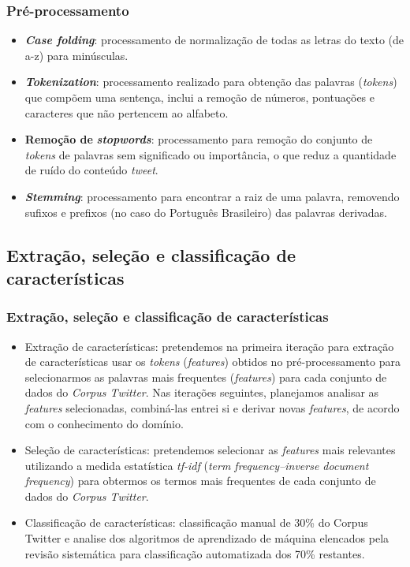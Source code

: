 \documentclass{beamer}
\begin{document}
\begin{frame}
\frametitle{Pré-processamento}
\begin{itemize}
\item \textit{\textbf{Case folding}}: processamento de normalização de todas as letras do texto (de a-z) para minúsculas.
\item \textit{\textbf{Tokenization}}: processamento realizado para obtenção das palavras  (\textit{tokens}) que compõem uma sentença, inclui a remoção de números, pontuações e caracteres que não pertencem ao alfabeto.  
\item \textbf{Remoção de} \textit{\textbf{stopwords}}: processamento para remoção do conjunto de \textit{tokens} de palavras sem significado ou importância, o que reduz a quantidade de ruído do conteúdo \textit{tweet}.
\item \textit{\textbf{Stemming}}: processamento para encontrar a raiz de uma palavra, removendo sufixos e prefixos (no caso do Português Brasileiro) das palavras derivadas.
\end{itemize}
\end{frame}
\subsection{Extração, seleção e classificação de características}
\begin{frame}
\frametitle{Extração, seleção e classificação de características}
\begin{itemize}
\item Extração de características: pretendemos na primeira iteração para extração de características usar os \textit{tokens} (\textit{features}) obtidos no pré-processamento para selecionarmos as palavras mais frequentes (\textit{features}) para cada conjunto de dados do \textit{Corpus Twitter}. Nas iterações seguintes, planejamos analisar as \textit{features} selecionadas, combiná-las entrei si e derivar novas \textit{features}, de acordo com o conhecimento do domínio.
\item Seleção de características: pretendemos selecionar as \textit{features} mais relevantes utilizando a medida estatística \textit{tf-idf} (\textit{term frequency–inverse document frequency}) para obtermos os termos mais frequentes de cada conjunto de dados do \textit{Corpus Twitter}.
\item Classificação de características: classificação manual de 30\% do Corpus Twitter e analise dos algoritmos de aprendizado de máquina elencados pela revisão sistemática para classificação automatizada dos 70\% restantes.
\end{itemize}
\end{frame}
\end{document}
